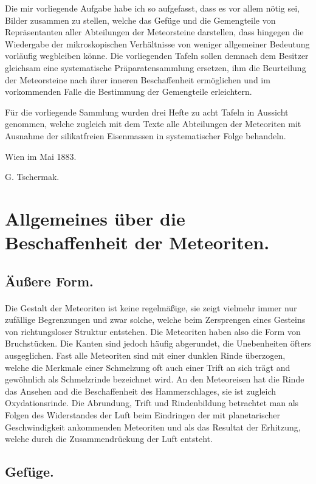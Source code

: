 \documentclass[a4paper, 12pt, oneside]{article}
\begin{document}
Die mir vorliegende Aufgabe habe ich so aufgefasst, dass es vor allem nötig sei, Bilder zusammen zu stellen, welche das Gefüge und die Gemengteile von Repräsentanten aller Abteilungen der Meteorsteine darstellen, dass hingegen die Wiedergabe der mikroskopischen Verhältnisse von weniger allgemeiner Bedeutung vorläufig wegbleiben könne. Die vorliegenden Tafeln sollen demnach dem Besitzer gleichsam eine systematische Präparatensammlung ersetzen, ihm die Beurteilung der Meteorsteine nach ihrer inneren Beschaffenheit ermöglichen und im vorkommenden Falle die Bestimmung der Gemengteile erleichtern.

Für die vorliegende Sammlung wurden drei Hefte zu acht Tafeln in Aussicht genommen, welche zugleich mit dem Texte alle Abteilungen der Meteoriten mit Ausnahme der silikatfreien Eisenmassen in systematischer Folge behandeln.

Wien im Mai 1883.

G. Tschermak.
\clearpage
\section{Allgemeines über die Beschaffenheit der Meteoriten.}
\subsection{Äußere Form.}
\paragraph*{}
Die Gestalt der Meteoriten ist keine regelmäßige, sie zeigt vielmehr immer nur zufällige Begrenzungen und zwar solche, welche beim Zersprengen eines Gesteins von richtungsloser Struktur entstehen. Die Meteoriten haben also die Form von Bruchstücken. Die Kanten sind jedoch häufig abgerundet, die Unebenheiten öfters ausgeglichen. Fast alle Meteoriten sind mit einer dunklen Rinde überzogen, welche die Merkmale einer Schmelzung oft auch einer Trift an sich trägt and gewöhnlich als Schmelzrinde bezeichnet wird. An den Meteoreisen hat die Rinde das Ansehen and die Beschaffenheit des Hammerschlages, sie ist zugleich Oxydationsrinde. Die Abrundung, Trift und Rindenbildung betrachtet man als Folgen des Widerstandes der Luft beim Eindringen der mit planetarischer Geschwindigkeit ankommenden Meteoriten und als das Resultat der Erhitzung, welche durch die Zusammendrückung der Luft entsteht.

\subsection{Gefüge.}
\end{document}
